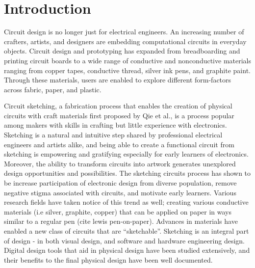 \documentclass{sigchi}
\begin{document}

\section{Introduction}

Circuit design is no longer just for electrical engineers. An increasing number of crafters, artists, and designers are embedding computational circuits in everyday objects.
Circuit design and prototyping has expanded from breadboarding and printing circuit boards to a wide range of conductive and nonconductive materials ranging from copper tapes, conductive thread, silver ink pens, and graphite paint.
Through these materials, users are enabled to explore different form-factors across fabric, paper, and plastic. 

Circuit sketching, a fabrication process that enables the creation of physical circuits with craft materials first proposed by Qie et al., is a process popular among makers with skills in crafting but little experience with electronics. Sketching is a natural and intuitive step shared by professional electrical engineers and artists alike, and being able to create a functional circuit from sketching is empowering and gratifying especially for early learners of electronics. Moreover, the ability to transform circuits into artwork generates unexplored design opportunities and possibilities.  
The sketching circuits process has shown to be increase participation of electronic design from diverse population, remove negative stigma associated with circuits, and motivate early learners. Various research fields have taken notice of this trend as well; creating various conductive materials (i.e silver, graphite, copper) that can be applied on paper in ways similar to a regular pen (cite lewis pen-on-paper). Advances in materials have enabled a new class of circuits that are ``sketchable''. 
Sketching is an integral part of design - in both visual design, and software and hardware engineering design. Digital design tools that aid in physical design have been studied extensively, and their benefits to the final physical design have been well documented.
\end{document}
